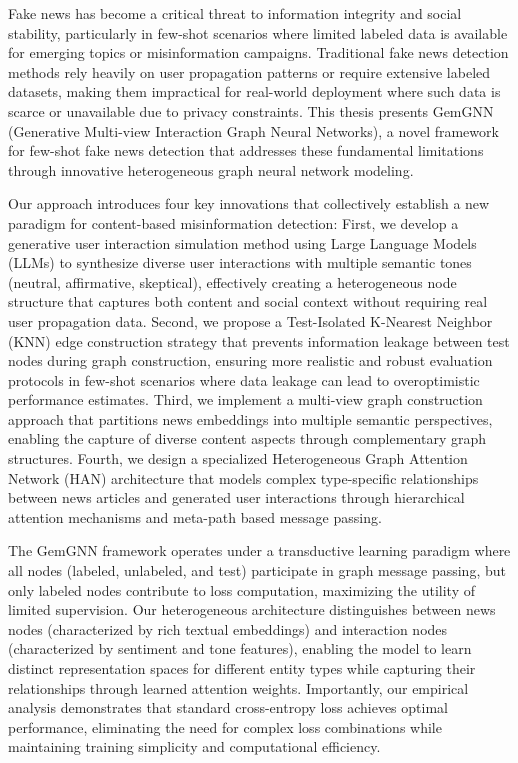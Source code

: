 \StartAbstract

Fake news has become a critical threat to information integrity and social stability, particularly in few-shot scenarios where limited labeled data is available for emerging topics or misinformation campaigns. Traditional fake news detection methods rely heavily on user propagation patterns or require extensive labeled datasets, making them impractical for real-world deployment where such data is scarce or unavailable due to privacy constraints. This thesis presents GemGNN (Generative Multi-view Interaction Graph Neural Networks), a novel framework for few-shot fake news detection that addresses these fundamental limitations through innovative heterogeneous graph neural network modeling.


Our approach introduces four key innovations that collectively establish a new paradigm for content-based misinformation detection: First, we develop a generative user interaction simulation method using Large Language Models (LLMs) to synthesize diverse user interactions with multiple semantic tones (neutral, affirmative, skeptical), effectively creating a heterogeneous node structure that captures both content and social context without requiring real user propagation data. Second, we propose a Test-Isolated K-Nearest Neighbor (KNN) edge construction strategy that prevents information leakage between test nodes during graph construction, ensuring more realistic and robust evaluation protocols in few-shot scenarios where data leakage can lead to overoptimistic performance estimates. Third, we implement a multi-view graph construction approach that partitions news embeddings into multiple semantic perspectives, enabling the capture of diverse content aspects through complementary graph structures. Fourth, we design a specialized Heterogeneous Graph Attention Network (HAN) architecture that models complex type-specific relationships between news articles and generated user interactions through hierarchical attention mechanisms and meta-path based message passing.


The GemGNN framework operates under a transductive learning paradigm where all nodes (labeled, unlabeled, and test) participate in graph message passing, but only labeled nodes contribute to loss computation, maximizing the utility of limited supervision. Our heterogeneous architecture distinguishes between news nodes (characterized by rich textual embeddings) and interaction nodes (characterized by sentiment and tone features), enabling the model to learn distinct representation spaces for different entity types while capturing their relationships through learned attention weights. Importantly, our empirical analysis demonstrates that standard cross-entropy loss achieves optimal performance, eliminating the need for complex loss combinations while maintaining training simplicity and computational efficiency.

